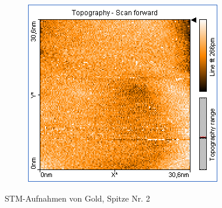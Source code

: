 \begin{figure}
\begin{subfigure}[b]{\picwidth}
        \caption{}
        \label{fig:gold_02_02}
    \end{subfigure}
    \begin{subfigure}[b]{\picwidth}
        \includegraphics[width=\textwidth]{data/Gold/pic_02_03_30nm}
        \caption{}
        \label{fig:gold_02_03}
    \end{subfigure}
    \caption{STM-Aufnahmen von Gold, Spitze Nr. 2}\label{fig:gold_01}
\end{figure}
\flushleft


